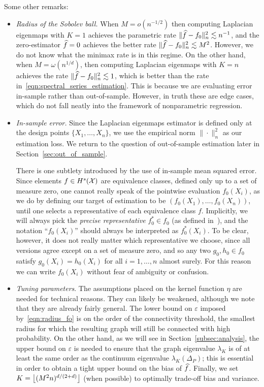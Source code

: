 Some other remarks:
\begin{itemize}
	\item \emph{Radius of the Sobolev ball.} 
	When $M = o(n^{-1/2})$ then computing Laplacian eigenmaps with $K = 1$ achieves the parametric rate $\|\widehat{f} - f_0\|_n^2 \lesssim n^{-1}$, and the zero-estimator $\widehat{f} = 0$ achieves the better rate $\|\widehat{f} - f_0\|_n^2 \lesssim M^2$. However, we do not know what the minimax rate is in this regime. On the other hand, when $M = \omega(n^{1/d})$, then computing Laplacian eigenmaps with $K = n$ achieves the rate $\|\widehat{f} - f_0\|_n^2 \lesssim 1$, which is better than the rate in~\eqref{eqn:spectral_series_estimation}. This is because we are evaluating error in-sample rather than out-of-sample. However, in truth these are edge cases, which do not fall neatly into the framework of nonparametric regression. 
	
	\item \emph{In-sample error.} Since the Laplacian eigenmaps estimator is defined only at the design points $\{X_1,\ldots,X_n\}$, we use the empirical norm $\|\cdot\|_n^2$ as our estimation loss. We return to the question of out-of-sample estimation later in Section~\ref{sec:out_of_sample}. 
	
	There is one subtlety introduced by the use of in-sample mean squared error. Since elements $f \in H^s(\mathcal{X})$ are equivalence classes, defined only up to a set of measure zero, one cannot really speak of the pointwise evaluation $f_0(X_i)$, as we do by defining our target of estimation to be $(f_0(X_1),\ldots,f_0(X_n))$, until one selects a representative of each equivalence class $f$. Implicitly, we will always pick the \emph{precise representative} $f_0^{\ast} \in f_0$ (as defined in~\cite{evans15}), and the notation ``$f_0(X_i)$'' should always be interpreted as $f_0^{\ast}(X_i)$. To be clear, however, it does not really matter which representative we choose, since all versions agree except on a set of measure zero, and so any two $g_0,h_0 \in f_0$ satisfy $g_0(X_i) = h_0(X_i)$ for all $i = 1,\ldots,n$ almost surely. For this reason we can write $f_0(X_i)$ without fear of ambiguity or confusion. 
	
	\item \emph{Tuning parameters}. The assumptions placed on the kernel function $\eta$ are needed for technical reasons. They can likely be weakened, although we note that they are already fairly general. The lower bound on $\varepsilon$ imposed by~\eqref{eqn:radius_fo} is on the order of the connectivity threshold, the smallest radius for which the resulting graph will still be connected with high probability. On the other hand, as we will see in Section~\ref{subsec:analysis}, the upper bound on $\varepsilon$ is needed to ensure that the graph eigenvalue $\lambda_K$ is of at least the same order as the continuum eigenvalue $\lambda_K(\Delta_P)$; this is essential in order to obtain a tight upper bound on the bias of $\widehat{f}$.  Finally, we set $K = \left\lfloor (M^2n)^{d/(2 + d)} \right\rfloor$ (when possible) to optimally trade-off bias and variance.
	

\end{itemize}

